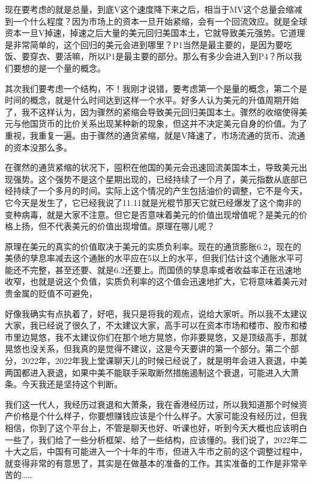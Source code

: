 \documentclass[UTF8, 12pt, a4paper]{ctexrep}
\begin{document}
现在要考虑的就是总量，到底V这个速度降下来之后，相当于MV这个总量会缩减到一个什么程度？因为市场上的资本一旦开始紧缩，会有一个回流效应。就是全球资本一旦V掉速，掉速之后大量的美元回归美国本土，它就导致美元强势。它道理是非常简单的，这个回归的美元会进到哪里？P1当然是最主要的，是因为要吃饭、要穿衣、要活嘛，所以P1是最主要的部分。那么有多少会进入到P4？所以我们要想的是一个量的概念。

其次我们要考虑一个结构，不！我刚才说错，要考虑第一个是量的概念，第二个是时间的概念，就是什么时间达到这样一个水平。好多人认为美元的升值周期开始了，我不这样认为，因为骤然的紧缩会导致美元回归美国本土。骤然的收缩使得美元与他国货币的比价关系出现某种新的现象，但这并不决定美元自身的价值。为了重视，我重复一遍。由于骤然的通货紧缩，就是V降速了，市场流通的货币、流通的资本没那么多。

在骤然的通货紧缩的状况下，囤积在他国的美元会迅速回流美国本土，导致美元出现强势。这个强势不是这个星期出现的，已经持续了一个月了，美元指数从底部已经持续了一个多月的时间。实际上这个情况的产生包括油价的调整，它不是今天，它今天是发生了，它已经我说了11.11就是光棍节那天它就已经爆发了这个南非的变种病毒，就是大家不注意。但它是否意味着美元的价值出现增值呢？是美元的价格上扬，但不代表美元的价值出现增值。原理在哪儿呢？

原理在美元的真实的价值取决于美元的实质负利率。现在的通货膨胀6.2，现在的美债的孳息率减去这个通胀的水平应在5以上的水平，但我们估计这个通胀水平可能还不完整，甚至还要、就是6.2还要上。而国债的孳息率或者收益率正在迅速地收窄，也就是说这个负值，实质负利率的这个值会迅速地扩大，它将意味着美元对贵金属的贬值不可避免，

好像我确实有点执着了，好吧，我只是将我的观点，说给大家听。所以我不太建议大家，我已经说了很久了，不太建议大家，高手可以在资本市场和楼市、股市和楼市里边晃悠，我不太建议你们在那个地方晃悠，你非要晃悠，又是顶级高手，那就晃悠也没关系，但我真的是觉得不建议，这是今天要讲的第一个部分。第二个部分，2022年，2022年我上堂课聊天儿的时候已经说了，就是明年会进入衰退，中美两国都进入衰退，如果中美不能联手采取断然措施遏制这个衰退，可能进入大萧条。今天我还是坚持这个判断。

我们这一代人，我经历过衰退和大萧条，我在香港经历过，所以我知道那个时候资产价格是个什么样子，你要想赚钱应该是个什么样子。大家可能没有经历过，但我相信，你到了这个平台上，不管是聊天也好、听课也好，听到今天大概也应该明白一些了，我们给了一些分析框架、给了一些结构，应该懂的。我们说了，2022年二十大之后，中国有可能进入一个十年的牛市，但进入牛市之前的这个调整过程中，就变得非常的有意思了，其实是在做基本的准备的工作。其实准备的工作是非常辛苦的……
\end{document}
